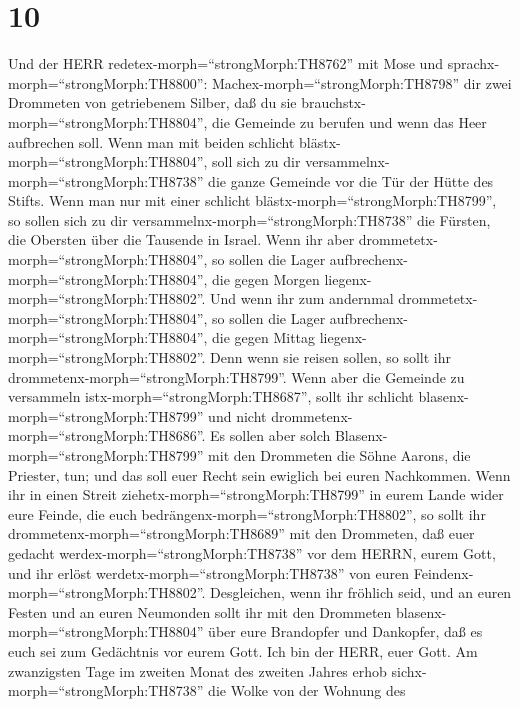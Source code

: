\hypertarget{section-9}{%
\section{10}\label{section-9}}

 Und der HERR redetex-morph=``strongMorph:TH8762'' mit Mose
und sprachx-morph=``strongMorph:TH8800'': 
Machex-morph=``strongMorph:TH8798'' dir zwei Drommeten von getriebenem
Silber, daß du sie brauchstx-morph=``strongMorph:TH8804'', die Gemeinde
zu berufen und wenn das Heer aufbrechen soll.  Wenn man mit
beiden schlicht blästx-morph=``strongMorph:TH8804'', soll sich zu dir
versammelnx-morph=``strongMorph:TH8738'' die ganze Gemeinde vor die Tür
der Hütte des Stifts.  Wenn man nur mit einer schlicht
blästx-morph=``strongMorph:TH8799'', so sollen sich zu dir
versammelnx-morph=``strongMorph:TH8738'' die Fürsten, die Obersten über
die Tausende in Israel.  Wenn ihr aber
drommetetx-morph=``strongMorph:TH8804'', so sollen die Lager
aufbrechenx-morph=``strongMorph:TH8804'', die gegen Morgen
liegenx-morph=``strongMorph:TH8802''.  Und wenn ihr zum
andernmal drommetetx-morph=``strongMorph:TH8804'', so sollen die Lager
aufbrechenx-morph=``strongMorph:TH8804'', die gegen Mittag
liegenx-morph=``strongMorph:TH8802''. Denn wenn sie reisen sollen, so
sollt ihr drommetenx-morph=``strongMorph:TH8799''.  Wenn
aber die Gemeinde zu versammeln istx-morph=``strongMorph:TH8687'', sollt
ihr schlicht blasenx-morph=``strongMorph:TH8799'' und nicht
drommetenx-morph=``strongMorph:TH8686''.  Es sollen aber
solch Blasenx-morph=``strongMorph:TH8799'' mit den Drommeten die Söhne
Aarons, die Priester, tun; und das soll euer Recht sein ewiglich bei
euren Nachkommen.  Wenn ihr in einen Streit
ziehetx-morph=``strongMorph:TH8799'' in eurem Lande wider eure Feinde,
die euch bedrängenx-morph=``strongMorph:TH8802'', so sollt ihr
drommetenx-morph=``strongMorph:TH8689'' mit den Drommeten, daß euer
gedacht werdex-morph=``strongMorph:TH8738'' vor dem HERRN, eurem Gott,
und ihr erlöst werdetx-morph=``strongMorph:TH8738'' von euren
Feindenx-morph=``strongMorph:TH8802''.  Desgleichen, wenn
ihr fröhlich seid, und an euren Festen und an euren Neumonden sollt ihr
mit den Drommeten blasenx-morph=``strongMorph:TH8804'' über eure
Brandopfer und Dankopfer, daß es euch sei zum Gedächtnis vor eurem Gott.
Ich bin der HERR, euer Gott.  Am zwanzigsten Tage im
zweiten Monat des zweiten Jahres erhob
sichx-morph=``strongMorph:TH8738'' die Wolke von der Wohnung des
